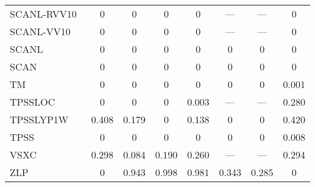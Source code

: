 \begin{table}
\begin{tabular}{|l|c|c|c|c|c|c|c|}
SCANL-RVV10~\cite{Mejia2017_052512,Mejia2018_115161,Peng2016_041005} & 0 & 0 & 0 & 0 & --- & --- & 0 \\
SCANL-VV10~\cite{Mejia2017_052512,Mejia2018_115161,Brandenburg2016_115144} & 0 & 0 & 0 & 0 & --- & --- & 0 \\
SCANL~\cite{Mejia2017_052512,Mejia2018_115161,Sun2015_036402} & 0 & 0 & 0 & 0 & 0 & 0 & 0 \\
SCAN~\cite{Sun2015_036402} & 0 & 0 & 0 & 0 & 0 & 0 & 0 \\
TM~\cite{Tao2016_073001} & 0 & 0 & 0 & 0 & 0 & 0 & 0.001 \\
TPSSLOC~\cite{Constantin2012_035130} & 0 & 0 & 0 & 0.003 & --- & --- & 0.280 \\
TPSSLYP1W~\cite{Dahlke2005_15677} & 0.408 & 0.179 & 0 & 0.138 & 0 & 0 & 0.420 \\
TPSS~\cite{Tao2003_146401,Perdew2004_6898} & 0 & 0 & 0 & 0 & 0 & 0 & 0.008 \\
VSXC~\cite{VanVoorhis1998_400} & 0.298 & 0.084 & 0.190 & 0.260 & --- & --- & 0.294 \\
ZLP~\cite{Zhao1993_918} & 0 & 0.943 & 0.998 & 0.981 & 0.343 & 0.285 & 0 \\
\bottomrule
\end{tabular}
\end{table}
